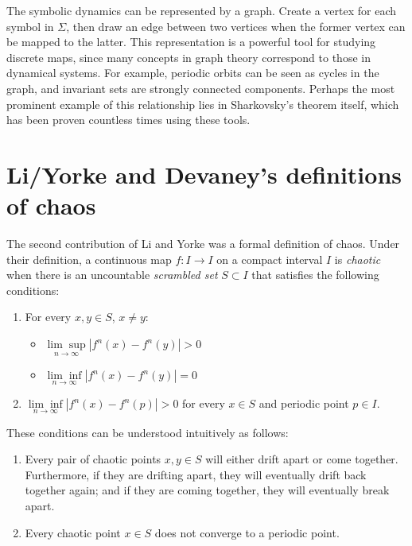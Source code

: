 \documentclass{article}
\begin{document}
The symbolic dynamics can be represented by a graph. Create a vertex for each symbol in $\Sigma$, then draw an edge between two vertices when the former vertex can be mapped to the latter. This representation is a powerful tool for studying discrete maps, since many concepts in graph theory correspond to those in dynamical systems. For example, periodic orbits can be seen as cycles in the graph, and invariant sets are strongly connected components. Perhaps the most prominent example of this relationship lies in Sharkovsky's theorem itself, which has been proven countless times using these tools.\cite{Sharkovsky:2008}

\section{Li/Yorke and Devaney's definitions of chaos}

The second contribution of Li and Yorke was a formal definition of chaos. Under their definition, a continuous map $f : I \rightarrow I$ on a compact interval $I$ is \emph{chaotic} when there is an uncountable \emph{scrambled set} $S \subset I$ that satisfies the following conditions:

\begin{enumerate}
    \item For every $x, y \in S$, $x \neq y$:
        \begin{itemize}
            \item
                $\underset{n\rightarrow\infty}{\lim\sup} \left| f^n(x) - f^n(y) \right| > 0$
            \item
                $\underset{n\rightarrow\infty}{\lim\inf} \left| f^n(x) - f^n(y) \right| = 0$
        \end{itemize}
    \item
        $\underset{n\rightarrow\infty}{\lim\inf} \left| f^n(x) - f^n(p) \right| > 0$
        for every $x \in S$ and periodic point $p \in I$.
\end{enumerate}

These conditions can be understood intuitively as follows:

\begin{enumerate}
    \item
        Every pair of chaotic points $x, y \in S$ will either drift apart or come together. Furthermore, if they are drifting apart, they will eventually drift back together again; and if they are coming together, they will eventually break apart.
    \item
        Every chaotic point $x \in S$ does not converge to a periodic point.
\end{enumerate}
\end{document}
